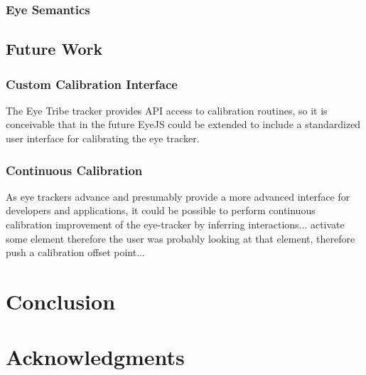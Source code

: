 \documentclass{sigchi}
\begin{document}
\subsubsection{Eye Semantics}


\subsection{Future Work}

\subsubsection{Custom Calibration Interface}
The Eye Tribe tracker provides API access to calibration routines, so
it is conceivable that in the future EyeJS could be extended to include
a standardized user interface for calibrating the eye tracker.

\subsubsection{Continuous Calibration}
As eye trackers advance and presumably provide a more advanced interface
for developers and applications, it could be possible to perform
continuous calibration improvement of the eye-tracker by inferring
interactions... activate some element therefore the user was probably
looking at that element, therefore push a calibration offset point...



\section{Conclusion}



\section{Acknowledgments}



\balance{}



\end{document}
